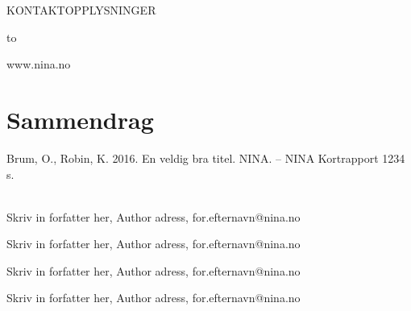 \documentclass[11pt, a4paper]{article}
\newcommand{\smallspace}{\vspace{3mm}}
\begin{document}
\vfill
\noindent
\footnotesize

\begin{minipage}{\linewidth}
KONTAKTOPPLYSNINGER \par\smallspace
\leavevmode\hbox to 
\par\smallspace
www.nina.no
\end{minipage}

\clearpage
\setcounter{secnumdepth}{0}
\section{Sammendrag}


\footnotesize{Brum, O., Robin, K. 2016. En veldig bra titel. NINA.} – NINA Kortrapport 1234 \pageref{LastPage} s.\par
\vspace{0.5cm}
\normalsize{
\blindtext} \\

\small
Skriv in forfatter her, Author adress, for.efternavn@nina.no  \par
Skriv in forfatter her, Author adress, for.efternavn@nina.no  \par
Skriv in forfatter her, Author adress, for.efternavn@nina.no  \par
Skriv in forfatter her, Author adress, for.efternavn@nina.no  \par
\normalsize
\end{document}
